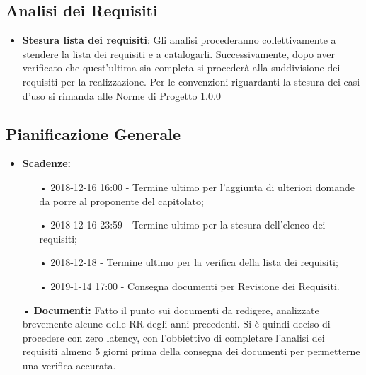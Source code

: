 \documentclass[a4paper, oneside, openany, dvipsnames, table]{article}
\begin{document}
\subsection{Analisi dei Requisiti}
\begin{itemize}
\item \textbf{Stesura lista dei requisiti}: Gli analisi procederanno collettivamente a stendere la lista dei requisiti e a catalogarli. Successivamente, dopo aver verificato che quest'ultima sia completa si procederà alla suddivisione dei requisiti per la realizzazione.
Per le convenzioni riguardanti la stesura dei casi d'uso si rimanda alle Norme di Progetto 1.0.0
\end{itemize}

\subsection{Pianificazione Generale}
\begin{itemize}
\item \textbf{Scadenze:} 
\begin{itemize}
\item[•] 2018-12-16 16:00 - Termine ultimo per l'aggiunta di ulteriori domande da porre al proponente del capitolato;
\item[•] 2018-12-16 23:59 - Termine ultimo per la stesura dell'elenco dei requisiti;
\item[•] 2018-12-18 - Termine ultimo per la verifica della lista dei requisiti;
\item[•] 2019-1-14 17:00 - Consegna documenti per Revisione dei Requisiti.
\end{itemize}
\item[•] \textbf{Documenti:} Fatto il punto sui documenti da redigere, analizzate brevemente alcune delle RR degli anni precedenti. Si è quindi deciso di procedere con zero latency, con l'obbiettivo di completare l'analisi dei requisiti almeno 5 giorni prima della consegna dei documenti per permetterne una verifica accurata.
\end{itemize}


\newpage
\end{document}
